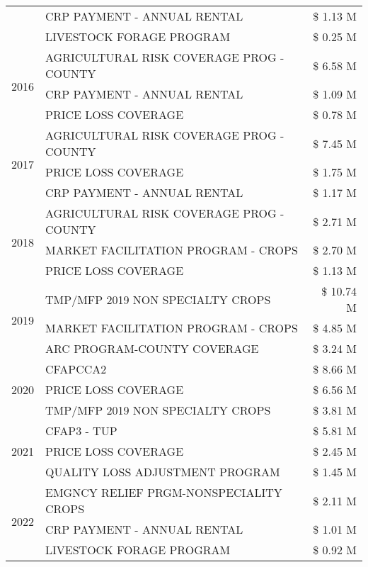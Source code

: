 \begin{tabular}{llr}
 & CRP PAYMENT - ANNUAL RENTAL & \$ 1.13 M \\
 & LIVESTOCK FORAGE PROGRAM & \$ 0.25 M \\
\cline{1-3}
\multirow[t]{3}{*}{2016} & AGRICULTURAL RISK COVERAGE PROG - COUNTY & \$ 6.58 M \\
 & CRP PAYMENT - ANNUAL RENTAL & \$ 1.09 M \\
 & PRICE LOSS COVERAGE & \$ 0.78 M \\
\cline{1-3}
\multirow[t]{3}{*}{2017} & AGRICULTURAL RISK COVERAGE PROG - COUNTY & \$ 7.45 M \\
 & PRICE LOSS COVERAGE & \$ 1.75 M \\
 & CRP PAYMENT - ANNUAL RENTAL & \$ 1.17 M \\
\cline{1-3}
\multirow[t]{3}{*}{2018} & AGRICULTURAL RISK COVERAGE PROG - COUNTY & \$ 2.71 M \\
 & MARKET FACILITATION PROGRAM - CROPS & \$ 2.70 M \\
 & PRICE LOSS COVERAGE & \$ 1.13 M \\
\cline{1-3}
\multirow[t]{3}{*}{2019} & TMP/MFP 2019 NON SPECIALTY CROPS & \$ 10.74 M \\
 & MARKET FACILITATION PROGRAM - CROPS & \$ 4.85 M \\
 & ARC PROGRAM-COUNTY COVERAGE & \$ 3.24 M \\
\cline{1-3}
\multirow[t]{3}{*}{2020} & CFAPCCA2 & \$ 8.66 M \\
 & PRICE LOSS COVERAGE & \$ 6.56 M \\
 & TMP/MFP 2019 NON SPECIALTY CROPS & \$ 3.81 M \\
\cline{1-3}
\multirow[t]{3}{*}{2021} & CFAP3 - TUP & \$ 5.81 M \\
 & PRICE LOSS COVERAGE & \$ 2.45 M \\
 & QUALITY LOSS ADJUSTMENT PROGRAM & \$ 1.45 M \\
\cline{1-3}
\multirow[t]{3}{*}{2022} & EMGNCY RELIEF PRGM-NONSPECIALITY CROPS & \$ 2.11 M \\
 & CRP PAYMENT - ANNUAL RENTAL & \$ 1.01 M \\
 & LIVESTOCK FORAGE PROGRAM & \$ 0.92 M \\
\cline{1-3}
\bottomrule
\end{tabular}
